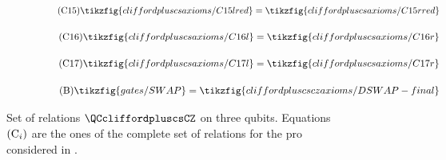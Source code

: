 \begin{figure}[ht]
{{\begin{minipage}{.975\textwidth}
\begin{center}
        \begin{subfigure}{0.68\textwidth}
            \begin{align}\label{cs-C15}\tag{C15}\tikzfig{cliffordpluscsaxioms/C15lred}=\tikzfig{cliffordpluscsaxioms/C15rred}\end{align}
        \end{subfigure}
        \begin{subfigure}{0.75\textwidth}
            \begin{align}\label{cs-C16-old}\tag{C16}\tikzfig{cliffordpluscsaxioms/C16l}=\tikzfig{cliffordpluscsaxioms/C16r}\end{align}
        \end{subfigure}
        \begin{subfigure}{0.92\textwidth}
            \begin{align}\label{cs-C17-old}\tag{C17}\tikzfig{cliffordpluscsaxioms/C17l}=\tikzfig{cliffordpluscsaxioms/C17r}\end{align}
        \end{subfigure}
        \begin{subfigure}{0.62\textwidth}
            \begin{align}\tag{B}\label{cs-DSWAP}\tikzfig{gates/SWAP}=\tikzfig{cliffordpluscsczaxioms/DSWAP-final}\end{align}
        \end{subfigure}
    \end{center}\end{minipage}}
    }
    \caption{Set of relations $\QCcliffordpluscsCZ$ on three qubits. Equations $(\textup{C}_i)$ are the ones of the complete set of relations for the pro considered in \cite{SelingerCliffordPlusCS}.}
    \label{appendix:oldgraphicallanguage5}
\end{figure}











